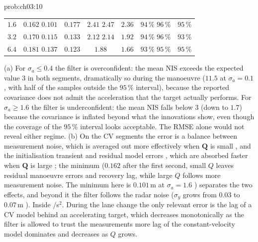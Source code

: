 \documentclass[graybox,envcountchap]{style/SNmono}
\providecommand{\DIFadd}[1]{{\protect\color{blue} #1}} %
\providecommand{\DIFdel}[1]{{\protect\color{red} #1}} %
\providecommand{\DIFaddbegin}{} %
\providecommand{\DIFaddend}{} %
\providecommand{\DIFdelbegin}{} %
\providecommand{\DIFdelend}{} %
\begin{document}
\begin{sol}{prob:ch03:10}
\begin{center}
\begin{tabular}{r cc cc cc}
$1.6$ & \DIFdelbegin \DIFdel{$0.162$ }\DIFdelend \DIFaddbegin \DIFadd{$0.101$ }\DIFaddend & $0.177$ & \DIFdelbegin \DIFdel{$2.41$ }\DIFdelend \DIFaddbegin \DIFadd{$2.47$ }\DIFaddend & $2.36$ & \DIFdelbegin \DIFdel{$94\,\%$ }\DIFdelend \DIFaddbegin \DIFadd{$96\,\%$ }\DIFaddend & $95\,\%$\\
$3.2$ & \DIFdelbegin \DIFdel{$0.170$ }\DIFdelend \DIFaddbegin \DIFadd{$0.115$ }\DIFaddend & $0.133$ & \DIFdelbegin \DIFdel{$2.12$ }\DIFdelend \DIFaddbegin \DIFadd{$2.14$ }\DIFaddend & $1.92$ & \DIFdelbegin \DIFdel{$94\,\%$ }\DIFdelend \DIFaddbegin \DIFadd{$96\,\%$ }\DIFaddend & $93\,\%$\\
$6.4$ & \DIFdelbegin \DIFdel{$0.181$ }\DIFdelend \DIFaddbegin \DIFadd{$0.137$ }\DIFaddend & $0.123$ & $1.88$ & $1.66$ & \DIFdelbegin \DIFdel{$93\,\%$ }\DIFdelend \DIFaddbegin \DIFadd{$95\,\%$ }\DIFaddend & $95\,\%$\\
\hline
\end{tabular}
\end{center}
(a) For $\sigma_a\le0.4$ the filter is overconfident: the mean NIS exceeds the expected value $3$ in both segments, dramatically so during the manoeuvre ($11.5$ at $\sigma_a=0.1$, with half of the samples outside the $95\,\%$ interval), because the reported covariance does not admit the acceleration that the target actually performs. For $\sigma_a\ge1.6$ the filter is underconfident: the mean NIS falls below $3$ (down to $1.7$) because the covariance is inflated beyond what the innovations show, even though the coverage of the $95\,\%$ interval looks acceptable. The RMSE alone would not reveal either regime.
(b) On the CV segments \DIFdelbegin \DIFdel{the error is a balance between measurement noise, which is averaged out more effectively when $\mathbf{Q}$ is small , and the initialisation transient and residual model errors , which are absorbed faster when $\mathbf{Q}$ is large ; the minimum ($0.162$}\DIFdelend \DIFaddbegin \DIFadd{after the first second, small $Q$ leaves residual manoeuvre errors and recovery lag, while large $Q$ follows more measurement noise. The minimum here is $0.101$}\DIFaddend \,m at $\sigma_a=1.6$\DIFdelbegin \DIFdel{) separates the two effects, and beyond it the filter follows the radar noise ($\sigma_y$ grows from $0.03$ to $0.07$}\DIFdelend \,m\DIFdelbegin \DIFdel{). Inside }\DIFdelend \DIFaddbegin \DIFadd{/s$^2$. During }\DIFaddend the lane change the \DIFdelbegin \DIFdel{only relevant error is the lag of a CV model behind an accelerating target, which decreases monotonically as the filter is allowed to trust the measurements more}\DIFdelend \DIFaddbegin \DIFadd{lag of the constant-velocity model dominates and decreases as $Q$ grows}\DIFaddend .

\end{sol}
\end{document}
